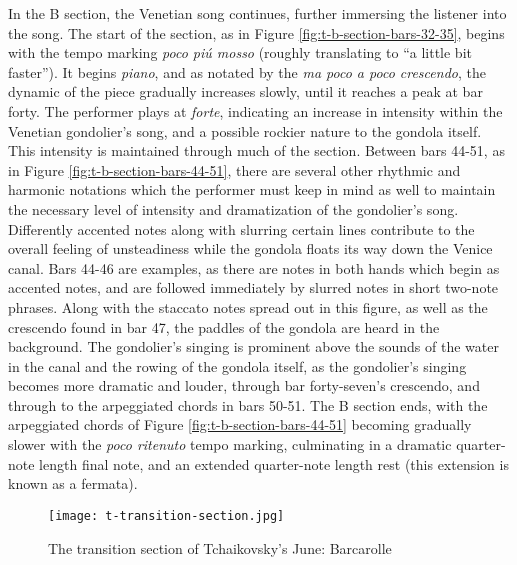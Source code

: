 In the B section, the Venetian song continues, further immersing the listener into the song. The start of the section, as in Figure \ref{fig:t-b-section-bars-32-35}\autocite{Henle_2002}, begins with the tempo marking \textit{poco piú mosso} (roughly translating to ``a little bit faster''). It begins \textit{piano}, and as notated by the \textit{ma poco a poco crescendo}, the dynamic of the piece gradually increases slowly, until it reaches a peak at bar forty. The performer plays at \textit{forte}, indicating an increase in intensity within the Venetian gondolier's song, and a possible rockier nature to the gondola itself. This intensity is maintained through much of the section. Between bars 44-51, as in Figure \ref{fig:t-b-section-bars-44-51}\autocite{Henle_2002}, there are several other rhythmic and harmonic notations which the performer must keep in mind as well to maintain the necessary level of intensity and dramatization of the gondolier's song. Differently accented notes along with slurring certain lines contribute to the overall feeling of unsteadiness while the gondola floats its way down the Venice canal. Bars 44-46 are examples, as there are notes in both hands which begin as accented notes, and are followed immediately by slurred notes in short two-note phrases. Along with the staccato notes spread out in this figure, as well as the crescendo found in bar 47, the paddles of the gondola are heard in the background. The gondolier's singing is prominent above the sounds of the water in the canal and the rowing of the gondola itself, as the gondolier's singing becomes more dramatic and louder, through bar forty-seven's crescendo, and through to the arpeggiated chords in bars 50-51. The B section ends, with the arpeggiated chords of Figure \ref{fig:t-b-section-bars-44-51}\autocite{Henle_2002} becoming gradually slower with the \textit{poco ritenuto} tempo marking, culminating in a dramatic quarter-note length final note, and an extended quarter-note length rest (this extension is known as a fermata).

\begin{figure}
  \centering
  \texttt{[image: t-transition-section.jpg]}
  \caption[Transitioning between B section and A' section in Tchaikovsky's June: Barcarolle]{The transition section of Tchaikovsky's June: Barcarolle}
  \label{fig:t-transition-section}
\end{figure}


